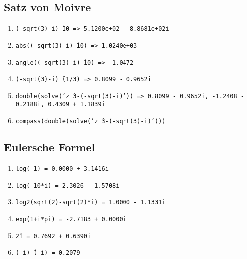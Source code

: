\subsection{Satz von Moivre}
\begin{enumerate}[$\texttt{>}\texttt{>}$]
\item {\color{red}\texttt{(-sqrt(3)-i)\^\,10 => 5.1200e+02 - 8.8681e+02i}}
\item {\color{red}\texttt{abs((-sqrt(3)-i)\^\,10) => 1.0240e+03}}
\item {\color{red}\texttt{angle((-sqrt(3)-i)\^\,10) => -1.0472}}
\item {\color{red}\texttt{(-sqrt(3)-i)\^\,(1/3) => 0.8099 - 0.9652i}}
\item {\color{red}\texttt{double(solve('z\^\,3-(-sqrt(3)-i)')) => 0.8099 - 0.9652i, -1.2408 - 0.2188i, 0.4309 + 1.1839i}}
\item {\color{red}\texttt{compass(double(solve('z\^\,3-(-sqrt(3)-i)')))}}
\end{enumerate}
\subsection{Eulersche Formel}
\begin{enumerate}[$\texttt{>}\texttt{>}$]
\item {\color{red}\texttt{log(-1) = 0.0000 + 3.1416i}}
\item {\color{red}\texttt{log(-10*i) = 2.3026 - 1.5708i}}
\item {\color{red}\texttt{log2(sqrt(2)-sqrt(2)*i) = 1.0000 - 1.1331i}}
\item {\color{red}\texttt{exp(1+i*pi) = -2.7183 + 0.0000i}}
\item {\color{red}\texttt{2\^i = 0.7692 + 0.6390i}}
\item {\color{red}\texttt{(-i)\^\,(-i) = 0.2079}}
\end{enumerate}